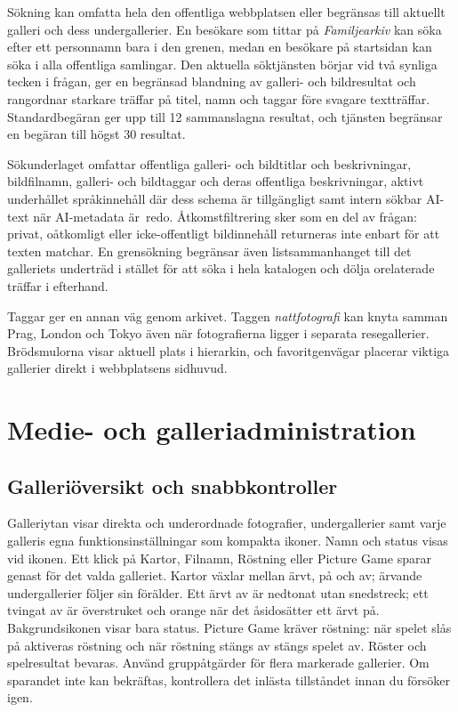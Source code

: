 \documentclass[11pt,a4paper]{article}
\begin{document}
Sökning kan omfatta hela den offentliga webbplatsen eller begränsas till
aktuellt galleri och dess undergallerier. En besökare som tittar på
\emph{Familjearkiv} kan söka efter ett personnamn bara i den grenen, medan en
besökare på startsidan kan söka i alla offentliga samlingar. Den aktuella
söktjänsten börjar vid två synliga tecken i frågan, ger en begränsad blandning
av galleri- och bildresultat och rangordnar starkare träffar på titel, namn och
taggar före svagare textträffar. Standardbegäran ger upp till 12 sammanslagna
resultat, och tjänsten begränsar en begäran till högst 30 resultat.

Sökunderlaget omfattar offentliga galleri- och bildtitlar och beskrivningar,
bildfilnamn, galleri- och bildtaggar och deras offentliga beskrivningar, aktivt
underhållet språkinnehåll där dess schema är tillgängligt samt intern sökbar
AI-text när AI-metadata är~redo. Åtkomstfiltrering sker som en del av frågan:
privat, oåtkomligt eller icke-offentligt bildinnehåll returneras inte enbart för
att texten matchar. En grensökning begränsar även listsammanhanget till det
galleriets underträd i stället för att söka i hela katalogen och dölja
orelaterade träffar i efterhand.

Taggar ger en annan väg genom arkivet. Taggen \emph{nattfotografi} kan knyta
samman Prag, London och Tokyo även när fotografierna ligger i separata
resegallerier. Brödsmulorna visar aktuell plats i hierarkin, och favoritgenvägar
placerar viktiga gallerier direkt i webbplatsens sidhuvud.
\section{Medie- och galleriadministration}
\label{sec:admin}

\subsection{Galleriöversikt och snabbkontroller}
Galleriytan visar direkta och underordnade fotografier, undergallerier samt
varje galleris egna funktionsinställningar som kompakta ikoner. Namn och status
visas vid ikonen. Ett klick på Kartor, Filnamn, Röstning eller Picture Game sparar
genast för det valda galleriet. Kartor växlar mellan ärvt, på och av; ärvande
undergallerier följer sin förälder. Ett ärvt av är nedtonat utan snedstreck;
ett tvingat av är överstruket och orange när det åsidosätter ett ärvt på.
Bakgrundsikonen visar bara status. Picture
Game kräver röstning: när spelet slås på aktiveras röstning och när röstning
stängs av stängs spelet av. Röster och spelresultat bevaras. Använd
gruppåtgärder för flera markerade gallerier. Om sparandet inte kan bekräftas,
kontrollera det inlästa tillståndet innan du försöker igen.
\end{document}
